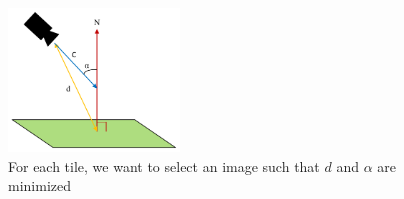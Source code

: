 \message{ !name(paper.tex)}\documentclass[10pt,twocolumn,letterpaper]{article}
\begin{document}
\begin{figure}
  \centering
  \includegraphics[height=1.5in]{scoringFunction.pdf}
  \caption{For each tile, we want to select an image such that $d$ and $\alpha$ are minimized}
  \label{fig:scoringFunction}
\end{figure}



\end{document}
